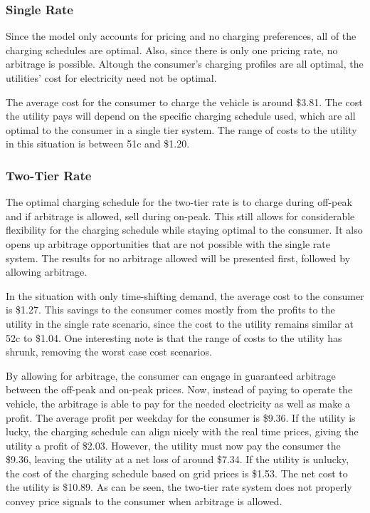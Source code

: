 \subsubsection{Single Rate}
Since the model only accounts for pricing and no charging preferences, all of the charging schedules are optimal.  Also, since there is only one pricing rate, no arbitrage is possible.  Altough the consumer's charging profiles are all optimal, the utilities' cost for electricity need not be optimal.  

The average cost for the consumer to charge the vehicle is around \$3.81.  The cost the utility pays will depend on the specific charging schedule used, which are all optimal to the consumer in a single tier system.  The range of costs to the utility in this situation is between 51c and \$1.20.

\subsubsection{Two-Tier Rate}
The optimal charging schedule for the two-tier rate is to charge during off-peak and if arbitrage is allowed, sell during on-peak.  This still allows for considerable flexibility for the charging schedule while staying optimal to the consumer.  It also opens up arbitrage opportunities that are not possible with the single rate system.  The results for no arbitrage allowed will be presented first, followed by allowing arbitrage.

In the situation with only time-shifting demand, the average cost to the consumer is \$1.27.  This savings to the consumer comes mostly from the profits to the utility in the single rate scenario, since the cost to the utility remains similar at 52c to \$1.04.  One interesting note is that the range of costs to the utility has shrunk, removing the worst case cost scenarios.

By allowing for arbitrage, the consumer can engage in guaranteed arbitrage between the off-peak and on-peak prices.  Now, instead of paying to operate the vehicle, the arbitrage is able to pay for the needed electricity as well as make a profit.  The average profit per weekday for the consumer is \$9.36.  If the utility is lucky, the charging schedule can align nicely with the real time prices, giving the utility a profit of \$2.03.  However, the utility must now pay the consumer the \$9.36, leaving the utility at a net loss of around \$7.34.  If the utility is unlucky, the cost of the charging schedule based on grid prices is \$1.53.  The net cost to the utility is \$10.89.  As can be seen, the two-tier rate system does not properly convey price signals to the consumer when arbitrage is allowed.

